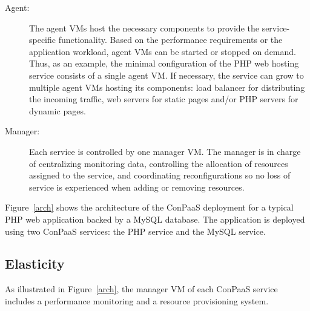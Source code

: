 \begin{description}
\item[Agent:] The agent VMs host the necessary components to provide the service-specific functionality. Based on the performance requirements or the application workload, agent VMs can be started or stopped on demand. Thus, as an example, the minimal configuration of the PHP web hosting service consists of a single agent VM. If necessary,
the service can grow to multiple agent VMs hosting its
components: load balancer for distributing the incoming traffic, web
servers for static pages and/or PHP servers for dynamic pages.
\item[Manager:] Each service is controlled by one manager VM. The manager is in charge of centralizing monitoring data, controlling the allocation of resources assigned to the service, and coordinating reconfigurations so no loss of service is experienced when adding or removing resources.
\end{description}

Figure~\ref{arch} shows the architecture of the ConPaaS deployment for
a typical PHP web application backed by a MySQL database. The
application is deployed using two ConPaaS services: the PHP service
and the MySQL service.


\subsection*{Elasticity}

As illustrated in Figure~\ref{arch}, the manager VM of each ConPaaS
service includes a performance monitoring and a resource provisioning
system.

